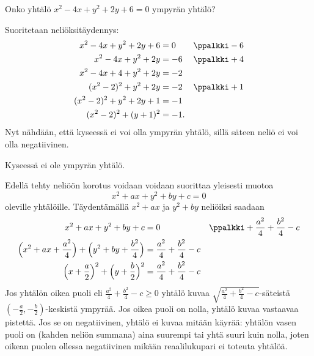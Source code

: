 \begin{esimerkki}
Onko yhtälö $x^2-4x+y^2+2y+6=0$ ympyrän yhtälö?
\begin{esimratk}
Suoritetaan neliöksitäydennys:
\begin{align*}
x^2-4x+y^2+2y+6&=0 && \ppalkki -6\\
x^2-4x+y^2+2y&=-6 && \ppalkki +4\\
x^2-4x+4+y^2+2y&=-2 && \\
(x^2-2)^2+y^2+2y&=-2 && \ppalkki +1\\
(x^2-2)^2+y^2+2y+1&=-1 && \\
(x^2-2)^2+(y+1)^2&=-1. &&
\end{align*}
Nyt nähdään, että kyseessä ei voi olla ympyrän yhtälö, sillä säteen neliö ei voi olla negatiivinen.
\end{esimratk}
\begin{esimvast}
Kyseessä ei ole ympyrän yhtälö.
\end{esimvast}
\end{esimerkki}

Edellä tehty neliöön korotus voidaan voidaan suorittaa yleisesti muotoa
\[
x^2+ax+y^2+by+c = 0
\]
oleville yhtälöille. Täydentämällä $x^2+ax$ ja $y^2+by$ neliöiksi saadaan
\begin{align*}
x^2+ax+y^2+by+c &= 0 && \ppalkki +\frac{a^2}{4}+\frac{b^2}{4}-c \\
\Big(x^2+ax+\frac{a^2}{4}\Big)+\Big(y^2+by+\frac{b^2}{4}\Big) &= \frac{a^2}{4}+\frac{b^2}{4}-c  \\
\Big(x+\frac{a}{2}\Big)^2+\Big(y+\frac{b}{2}\Big)^2 &= \frac{a^2}{4}+\frac{b^2}{4}-c
\end{align*}
Jos yhtälön oikea puoli eli $\frac{a^2}{4}+\frac{b^2}{4}-c \geq 0$ yhtälö kuvaa $\sqrt{\frac{a^2}{4}+\frac{b^2}{4}-c}$-säteistä $(-\frac{a}{2}, -\frac{b}{2})$-keskistä ympyrää. Jos oikea puoli on nolla, yhtälö kuvaa vastaavaa pistettä. Jos se on negatiivinen, yhtälö ei kuvaa mitään käyrää: yhtälön vasen puoli on (kahden neliön summana) aina suurempi tai yhtä suuri kuin nolla, joten oikean puolen ollessa negatiivinen mikään reaalilukupari ei toteuta yhtälöä.



